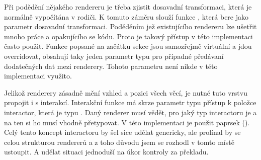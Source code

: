 Při podědění nějakého rendereru je třeba zjistit dosavadní transformaci, která je normálně vypočítána v rodiči.
K tomuto záměru slouží funkce , která bere jako parametr dosavadní transformaci.
Poděděním jež existujícího rendereru lze ušetřit mnoho práce a opakujícího se kódu. Proto je takový přístup v této implementaci často použit.
Funkce popsané na začátku sekce jsou samozřejmě virtuální a jdou overridovat,
obsahují taky jeden parametr typu  pro případné předávaní dodatečných dat mezi renderery. Tohoto parametru není nikde v této implementaci využito.

Jelikož renderery zásadně mění vzhled a pozici všech věcí, je nutné tuto vrstvu propojit i s interakcí.
Interakční funkce má skrze parametr typu   přístup k položce interactor, která je typu .
Daný renderer musí vědět, pro jaký typ interactoru je a na ten si ho musí vhodně přetypovat. V této implementaci je použit paprsek (). 
Celý tento koncept interactoru by šel sice udělat genericky, ale prolínal by se celou strukturou rendererů a z toho
důvodu jsem se rozhodl v tomto místě ustoupit. A udělat situaci jednoduší na úkor kontroly za překladu.